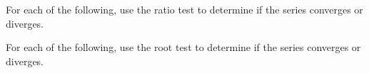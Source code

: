 \begin{questions}
\question For each of the following, use the ratio test to determine if the series converges or diverges.


\newpage

\question For each of the following, use the root test to determine if the series converges or diverges.




\end{questions}